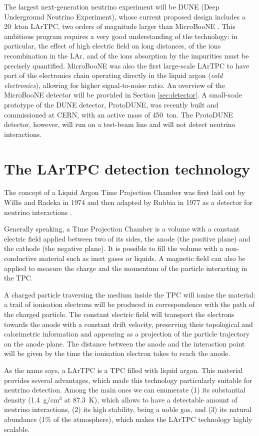 The largest next-generation neutrino experiment will be DUNE (Deep Underground Neutrino Experiment), whose current proposed design includes a 20~kton LArTPC, two orders of magnitude larger than MicroBooNE \cite{Acciarri:2016ooe}. This ambitious program requires a very good understanding of the technology: in particular, the effect of high electric field on long distances, of the ions recombination in the LAr, and of the ions absorption by the impurities must be precisely quantified. 
MicroBooNE was also the first large-scale LArTPC to have part of the electronics chain operating directly in the liquid argon (\emph{cold electronics}), allowing for higher signal-to-noise ratio. An overview of the MicroBooNE detector will be provided in Section \ref{sec:detector}.
A small-scale prototype of the DUNE detector, ProtoDUNE, was recently built and commissioned at CERN, with an active mass of 450~ton. The ProtoDUNE detector, however, will run on a test-beam line and will not detect neutrino interactions.

\section{The LArTPC detection technology}
The concept of a Liquid Argon Time Projection Chamber was first laid out by Willis and Radeka in 1974 \cite{Willis:1974gi} and then adapted by Rubbia in 1977 as a detector for neutrino interactions \cite{Rubbia:1977zz}. 

Generally speaking, a Time Projection Chamber is a volume with a constant electric field applied between two of its sides, the anode (the positive plane) and the cathode (the negative plane). It is possible to fill the volume with a non-conductive material such as inert gases or liquids. A magnetic field can also be applied to measure the charge and the momentum of the particle interacting in the TPC. 

A charged particle traversing the medium inside the TPC will ionise the material: a trail of ionisation electrons will be produced in correspondence with the path of the charged particle. The constant electric field will transport the electrons towards the anode with a constant drift velocity, preserving their topological and calorimetric information and appearing as a projection of the particle trajectory on the anode plane. The distance between the anode and the interaction point will be given by the time the ionisation electron takes to reach the anode.

As the name says, a LArTPC is a TPC filled with liquid argon. This material provides several advantages, which made this technology particularly suitable for neutrino detection. Among the main ones we can enumerate (1) its substantial density (1.4~g/cm$^3$ at 87.3~K), which allows to have a detectable amount of neutrino interactions, (2) its high stability, being a noble gas, and (3) its natural abundance (1\% of the atmosphere), which makes the LArTPC technology highly scalable.

